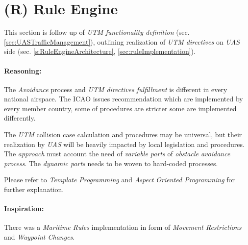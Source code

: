 \newpage
\section{(R) Rule Engine}\label{sec:ruleEngine}

\noindent This section is follow up of \emph{UTM functionality definition} (sec. \ref{sec:UASTrafficManagement}), outlining realization of \emph{UTM directives} on \emph{UAS} side (sec. \ref{s:RuleEngineArchitecture},  \ref{sec:ruleImplementation}).

\paragraph{Reasoning:} The \emph{Avoidance} process and \emph{UTM directives fulfillment} is different in every national airspace. The ICAO issues recommendation \cite{icao4444,icaoAnnex2} which are implemented by every member country, some of procedures are stricter some are implemented differently.

The \emph{UTM} collision case calculation and procedures may be universal, but their realization by \emph{UAS} will be heavily impacted by local legislation and procedures.  The \emph{approach} must account the need of \emph{variable parts} of \emph{obstacle avoidance process}. The \emph{dynamic parts} needs to be woven to hard-coded processes. 

\begin{note}
	Please refer to \emph{Template Programming} and \emph{Aspect Oriented Programming} for further explanation.
\end{note}

\paragraph{Inspiration:} There was a \emph{Maritime Rules} implementation \cite{benjamin2006navigation} in form of \emph{Movement Restrictions} and \emph{Waypoint Changes}.
